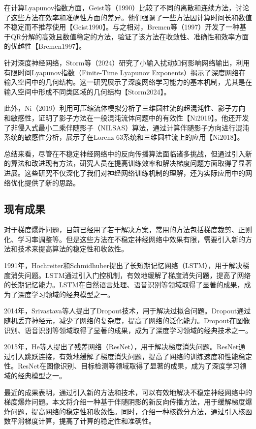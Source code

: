 \documentclass[12pt,a4paper]{amsart}
\begin{document}
在计算Lyapunov指数方面，Geist等（1990）比较了不同的离散和连续方法，讨论了这些方法在效率和准确性方面的差异。他们强调了一些方法因计算时间长和数值不稳定而不推荐使用【Geist1990】。与之相对，Bremen等（1997）开发了一种基于QR分解的高效且数值稳定的方法，验证了该方法在收敛性、准确性和效率方面的优越性【Bremen1997】。

针对深度神经网络，Storm等（2024）研究了小输入扰动如何影响网络输出，利用有限时间Lyapunov指数（Finite-Time Lyapunov Exponents）揭示了深度网络在输入空间中的几何结构。这一研究展示了深度网络学习能力的基本机制，尤其是在输入空间中形成不同类区域的几何结构【Storm2024】。

此外，Ni（2019）利用可压缩流体模拟分析了三维圆柱流的超混沌性、影子方向和敏感性，证明了影子方法在一般混沌流体问题中的有效性【Ni2019】。他还开发了非侵入式最小二乘伴随影子（NILSAS）算法，通过计算伴随影子方向进行混沌系统的敏感性分析，展示了在Lorenz 63系统和三维圆柱流上的应用【Ni2018】。

总结来看，尽管在不稳定神经网络中的反向传播算法面临诸多挑战，但通过引入新的算法和改进现有方法，研究人员在提高训练效率和解决梯度问题方面取得了显著进展。这些研究不仅深化了我们对神经网络训练机制的理解，还为实际应用中的网络优化提供了新的思路。

\subsection{现有成果}

对于梯度爆炸问题，目前已经用了若干解决方案，常用的方法包括梯度裁剪、正则化、学习率调整等。但是这些方法在不稳定神经网络中效果有限，需要引入新的方法和技术来提高算法的稳定性和收敛性。

1991年，Hochreiter和Schmidhuber提出了长短期记忆网络（LSTM），用于解决梯度消失问题。LSTM通过引入门控机制，有效地缓解了梯度消失问题，提高了网络的长期记忆能力。LSTM在自然语言处理、语音识别等领域取得了显著的成果，成为了深度学习领域的经典模型之一。

2014年，Srivastava等人提出了Dropout技术，用于解决过拟合问题。Dropout通过随机丢弃神经元，减少了网络的复杂度，提高了网络的泛化能力。Dropout在图像识别、语音识别等领域取得了显著的成果，成为了深度学习领域的经典技术之一。

2015年，He等人提出了残差网络（ResNet），用于解决梯度消失问题。ResNet通过引入跳跃连接，有效地缓解了梯度消失问题，提高了网络的训练速度和性能稳定性。ResNet在图像识别、目标检测等领域取得了显著的成果，成为了深度学习领域的经典模型之一。

最近的成果表明，通过引入新的方法和技术，可以有效地解决不稳定神经网络中的梯度爆炸问题。本文将介绍一种基于伴随阴影的新反向传播方法，用于缓解梯度爆炸问题，提高网络的稳定性和收敛性。同时，介绍一种核微分方法，通过引入核函数平滑梯度计算，提高了计算的稳定性和准确性。
\end{document}
